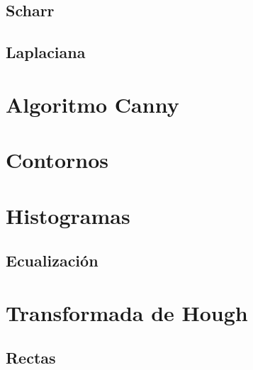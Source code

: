 \subsection{Scharr}
\subsection{Laplaciana}

\section{Algoritmo Canny}

\section{Contornos}

\section{Histogramas}
\subsection{Ecualización}

\section{Transformada de Hough}
\subsection{Rectas}